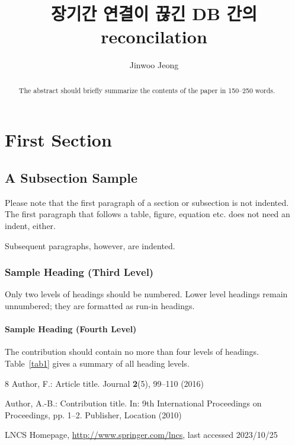 \documentclass[runningheads]{llncs}
\begin{document}
%
\title{장기간 연결이 끊긴 DB 간의 reconcilation}
%
%
\author{Jinwoo Jeong}
%
%
%
\maketitle              %
%
\begin{abstract}
The abstract should briefly summarize the contents of the paper in
150--250 words.

\end{abstract}
%
%
%
\section{First Section}
\subsection{A Subsection Sample}
Please note that the first paragraph of a section or subsection is
not indented. The first paragraph that follows a table, figure,
equation etc. does not need an indent, either.

Subsequent paragraphs, however, are indented.

\subsubsection{Sample Heading (Third Level)} Only two levels of
headings should be numbered. Lower level headings remain unnumbered;
they are formatted as run-in headings.

\paragraph{Sample Heading (Fourth Level)}
The contribution should contain no more than four levels of
headings. Table~\ref{tab1} gives a summary of all heading levels.

%
%
%
% 
% 
%
\begin{thebibliography}{8}
Author, F.: Article title. Journal \textbf{2}(5), 99--110 (2016)

Author, A.-B.: Contribution title. In: 9th International Proceedings
on Proceedings, pp. 1--2. Publisher, Location (2010)

LNCS Homepage, \url{http://www.springer.com/lncs}, last accessed 2023/10/25
\end{thebibliography}
\end{document}

